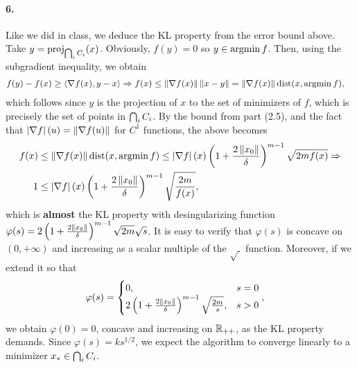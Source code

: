 \documentclass[10pt]{article}
\begin{document}
\paragraph{6.}
Like we did in class, we deduce the KL property from the error bound above.
Take $y = \mathrm{proj}_{\operatorname*{\bigcap}_i C_i} (x)$. Obviously, $f(y) = 0$ so $y \in
\operatorname*{argmin} f$. Then, using the subgradient inequality, we obtain
\begin{align*}
    f(y) - f(x) &\geq \left\langle \nabla f(x), y - x \right\rangle \Rightarrow
    f(x) \leq \left \| \nabla f(x) \right \| \left \| x - y \right \| = \left \| \nabla f(x) \right \|
    \mathrm{dist}(x, \operatorname*{argmin} f),
\end{align*}
which follows since $y$ is the projection of $x$ to the set of minimizers of
$f$, which is precisely the set of points in $\operatorname*{\bigcap}_i C_i$. By the bound from
part (2.5), and the fact that $\left| \nabla f \right|(u) = \left \| \nabla f(u) \right \|$ for $C^1$
functions, the above becomes
\begin{align}
    \begin{aligned}
    f(x) &\leq \left \| \nabla f(x) \right \| \mathrm{dist}(x, \operatorname*{argmin} f) \leq
    \left| \nabla f \right|(x) \left(1 + \frac{2 \left \| x_0 \right \|}{\delta}\right)^{m-1}
    \sqrt{2m f(x)} \Rightarrow \\
    1 &\leq \left| \nabla f \right|(x) \left(1 + \frac{2 \left \| x_0 \right \|}{\delta}\right)^{m-1}
        \sqrt{\frac{2m}{f(x)}},
    \end{aligned} \label{eq:KL-prop}
\end{align}
which is \textbf{almost} the KL property with desingularizing function
$\varphi(s) = 2 \left(1 + \frac{2 \left \| x_0 \right \|}{\delta}\right)^{m-1} \sqrt{2m}
\sqrt{s}$. It is easy to verify that $\varphi(s)$ is concave on $(0, +\infty)$
and increasing as a scalar multiple of the $\sqrt{~}$ function. Moreover, if
we extend it so that
\begin{align*}
    \varphi(s) &= \begin{cases}
        0, & s = 0 \\
        2\left(1 + \frac{2 \left \| x_0 \right \|}{\delta}\right)^{m-1} \sqrt{\frac{2m}{s}},
        & s > 0
    \end{cases},
\end{align*}
we obtain $\varphi(0) = 0$, concave and increasing on $\mathbb{R}_{++}$, as the KL
property demands. Since $\varphi(s) = ks^{1/2}$, we expect the algorithm to
converge linearly to a minimizer $x_* \in \operatorname*{\bigcap}_i C_i$.
\end{document}
